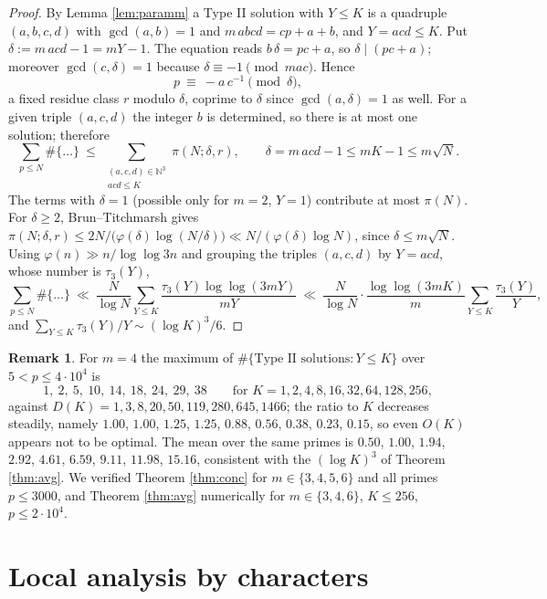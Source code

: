 \documentclass[11pt,reqno]{amsart}
\theoremstyle{plain}
\theoremstyle{definition}
\newtheorem{remark}[theorem]{Remark}
\numberwithin{equation}{section}
\newcommand{\N}{\mathbb{N}}
\begin{document}
\begin{proof}
By Lemma \ref{lem:paramm} a Type II solution with $Y\le K$ is a quadruple $(a,b,c,d)$
with $\gcd(a,b)=1$ and $m\,abcd=cp+a+b$, and $Y=acd\le K$. Put
$\delta:=m\,acd-1=mY-1$. The equation reads $b\,\delta=pc+a$, so $\delta\mid(pc+a)$;
moreover $\gcd(c,\delta)=1$ because $\delta\equiv-1\pmod{mac}$. Hence
\[
  p\ \equiv\ -a\,c^{-1}\pmod{\delta},
\]
a fixed residue class $r$ modulo $\delta$, coprime to $\delta$ since
$\gcd(a,\delta)=1$ as well. For a given triple $(a,c,d)$ the integer $b$ is determined,
so there is at most one solution; therefore
\[
  \sum_{p\le N}\#\{\dots\}\ \le\ \sum_{\substack{(a,c,d)\in\N^{3}\\ acd\le K}}\pi(N;\delta,r),
  \qquad \delta=m\,acd-1\le mK-1\le m\sqrt N .
\]
The terms with $\delta=1$ (possible only for $m=2$, $Y=1$) contribute at most $\pi(N)$.
For $\delta\ge2$, Brun--Titchmarsh \cite{MontgomeryVaughan} gives
$\pi(N;\delta,r)\le 2N/\bigl(\varphi(\delta)\log(N/\delta)\bigr)\ll N/(\varphi(\delta)\log N)$,
since $\delta\le m\sqrt N$. Using $\varphi(n)\gg n/\log\log 3n$ and grouping the triples
$(a,c,d)$ by $Y=acd$, whose number is $\tau_{3}(Y)$,
\[
  \sum_{p\le N}\#\{\dots\}\ \ll\ \frac{N}{\log N}\sum_{Y\le K}
  \frac{\tau_{3}(Y)\log\log(3mY)}{mY}
  \ \ll\ \frac{N}{\log N}\cdot\frac{\log\log(3mK)}{m}\sum_{Y\le K}\frac{\tau_{3}(Y)}{Y},
\]
and $\sum_{Y\le K}\tau_{3}(Y)/Y\sim(\log K)^{3}/6$.
\end{proof}

\begin{remark}\label{rem:sharp}
For $m=4$ the maximum of $\#\{\text{Type II solutions}:Y\le K\}$ over $5<p\le4\cdot10^{4}$
is
\[
  1,\ 2,\ 5,\ 10,\ 14,\ 18,\ 24,\ 29,\ 38\qquad\text{for }K=1,2,4,8,16,32,64,128,256,
\]
against $D(K)=1,3,8,20,50,119,280,645,1466$; the ratio to $K$ decreases steadily,
namely $1.00$, $1.00$, $1.25$, $1.25$, $0.88$, $0.56$, $0.38$, $0.23$, $0.15$, so even
$O(K)$ appears not to be optimal. The mean over the same primes is $0.50$, $1.00$,
$1.94$, $2.92$, $4.61$, $6.59$, $9.11$, $11.98$, $15.16$, consistent with the $(\log K)^{3}$ of Theorem \ref{thm:avg}. We verified Theorem
\ref{thm:conc} for $m\in\{3,4,5,6\}$ and all primes $p\le3000$, and Theorem
\ref{thm:avg} numerically for $m\in\{3,4,6\}$, $K\le256$, $p\le2\cdot10^{4}$.
\end{remark}

\section{Local analysis by characters}\label{sec:char}
\end{document}
